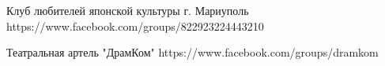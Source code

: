 
 
 
 
 

Клуб любителей японской культуры г. Мариуполь
https://www.facebook.com/groups/822923224443210

Театральная артель "ДрамКом"
https://www.facebook.com/groups/dramkom
